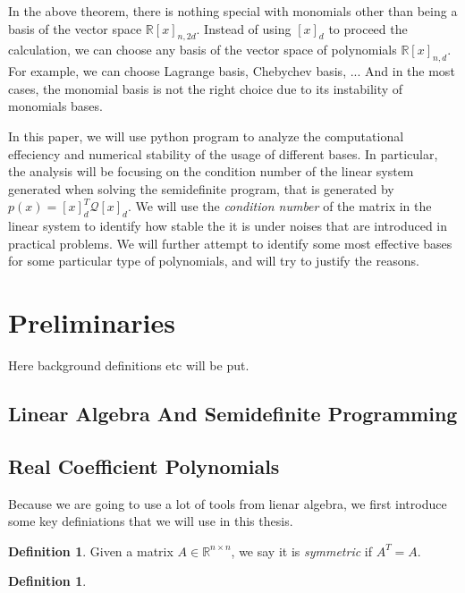 \documentclass[12pt]{amsart}
\numberwithin{equation}{section}
\theoremstyle{definition}
\newtheorem{definition}[thm]{Definition}
\numberwithin{thm}{section}
\begin{document}
In the above theorem, there is nothing special with monomials other than being a basis of the vector space $\mathbb{R}[x]_{n,2d}$. 
Instead of using $[x]_d$ to proceed the calculation,
we can choose any basis of the vector space of polynomials $\mathbb{R}[x]_{n,d}$. 
For example, we can choose Lagrange basis, Chebychev basis, ... And in the most cases,
the monomial basis is not the right choice due to its instability of monomials bases.

In this paper, we will use python program to analyze the computational effeciency and 
numerical stability of the usage of different bases. In particular, the analysis will
be focusing on the condition number of the linear system generated when solving the 
semidefinite program, that is generated by $p(x) = [x]_d^T \mathcal{Q} [x]_d $. 
We will use the \emph{condition number} of the matrix in the linear system to identify how stable the
it is under noises that are introduced in practical problems.  
We will further attempt to identify some most effective bases for some particular
type of polynomials, and will try to justify the reasons.  


\newpage

\section{Preliminaries}
\label{Sec:Preliminaries}

Here background definitions etc will be put. 

\subsection{Linear Algebra And Semidefinite Programming}
\label{Sec:Linear Algebra}

\subsection{Real Coefficient Polynomials}
\label{Sec:Real Coefficient Polynomials}

Because we are going to use a lot of tools from lienar algebra, we first introduce some key definiations that we will use in this thesis.

\begin{definition}
     Given a matrix $A \in \mathbb{R}^{n \times n}$, we say it is \emph{symmetric} if $A^T = A$.
\end{definition}

\begin{definition}
\label{def:SDP}

\end{definition}
\end{document}
